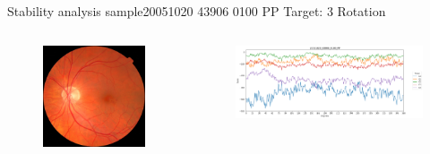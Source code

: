 \documentclass{beamer}
\begin{document}
\begin{frame}{Stability analysis sample}{20051020 43906 0100 PP Target: 3 Rotation}
\begin{columns}
	\begin{column}{0.3\textwidth}
		\begin{figure}[p]
			\centering
			\includegraphics[width=\textwidth]{chapter_stability/20051020_43906_0100_PP/20051020_43906_0100_PP.jpeg}
		\end{figure}	
	\end{column}
	\begin{column}{0.45\textwidth}  %
		\begin{figure}[p]
			\centering
			\includegraphics[width=\textwidth]{chapter_stability/20051020_43906_0100_PP/r/scores.png}
		\end{figure}
		\centering
		\href{run:videos_stability/Messidor_20051020_43906_0100_PP_Target_3_Checking_Rotation_Sensitivity.mp4}{\color{blue}{Rotation Visualization}} 
	\end{column}
\end{columns}
\end{frame}
\end{document}
